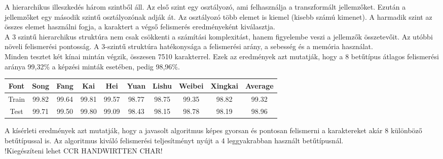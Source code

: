 A hierarchikus illeszkedés három szintből áll. Az első szint egy osztályozó, ami felhasználja a transzformált jellemzőket. Ezután a jellemzőket egy második szintű osztályozónak adják át. Az osztályozó több elemet is kiemel (kisebb számú kimenet). A harmadik szint az összes elemet használni fogja, a karaktert a végső felismerés eredményeként kiválasztja.\\

A 3 szintű hierarchikus struktúra nem csak csökkenti a számítási komplexitást, hanem figyelembe veszi a jellemzők összetevőit. Az utóbbi növeli felismerési pontosság. A 3-szintű struktúra hatékonysága a felismerési arány, a sebesség és a memória használat.\\

Minden tesztet két kínai mintán végzik, összesen 7510 karakterrel. Ezek az eredmények azt mutatják, hogy a 8 betűtípus átlagos felismerési aránya 99,32\% a képzési minták esetében, pedig 98,96\%.\\

\begin{center}
\begin{tabular}{ |c|c|c|c|c|c|c|c|c|c|}
\hline
Font & Song & Fang & Kai & Hei & Yuan & Lishu & Weibei & Xingkai & Average\\
\hline
Train & 99.82 & 99.64 & 99.81 & 99.57 & 98.77 & 98.75 & 99.35 & 98.82 & 99.32\\
\hline
Test & 99.71 & 99.50 & 99.80 & 99.09 & 98.43 & 98.15 & 98.78 & 98.19 & 98.96\\
\hline
\end{tabular}
\end{center}

A kísérleti eredmények azt mutatják, hogy a javasolt algoritmus képes gyorsan és pontosan felismerni a karaktereket akár 8 különböző betűtípussal is. Az algoritmus kiváló felismerési teljesítményt nyújt a 4 leggyakrabban használt betűtípusnál.\\

!Kiegészíteni lehet CCR HANDWIRTTEN CHAR!